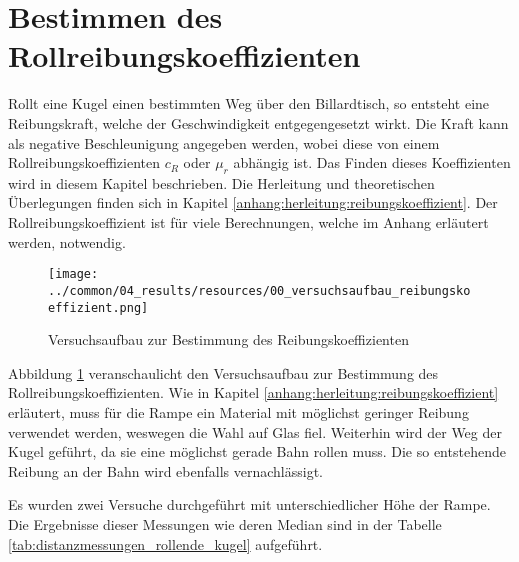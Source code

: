 \section{Bestimmen des Rollreibungskoeffizienten}
Rollt eine Kugel einen bestimmten Weg über den Billardtisch, so entsteht eine Reibungskraft, welche der
Geschwindigkeit entgegengesetzt wirkt. Die Kraft kann als negative Beschleunigung angegeben werden, wobei diese von einem
Rollreibungskoeffizienten $c_R$ oder $\mu_r$ abhängig ist. Das Finden dieses Koeffizienten wird in diesem Kapitel beschrieben.
Die Herleitung und theoretischen Überlegungen finden sich in Kapitel \ref{anhang:herleitung:reibungskoeffizient}.
Der Rollreibungskoeffizient ist für viele Berechnungen, welche im Anhang erläutert werden, notwendig.

\begin{figure}[h!]
    \begin{center}
        \texttt{[image: ../common/04\_results/resources/00\_versuchsaufbau\_reibungskoeffizient.png]}
    \end{center}
    \caption{Versuchsaufbau zur Bestimmung des Reibungskoeffizienten}
    \label{fig:versuchsaufbau_reibungskoeffizient}
\end{figure}

Abbildung \ref{fig:versuchsaufbau_reibungskoeffizient} veranschaulicht den Versuchsaufbau zur Bestimmung des
Rollreibungskoeffizienten. Wie in Kapitel \ref{anhang:herleitung:reibungskoeffizient} erläutert, muss für die
Rampe ein Material mit möglichst geringer Reibung verwendet werden, weswegen die Wahl auf Glas fiel.
Weiterhin wird der Weg der Kugel geführt, da sie eine möglichst gerade Bahn rollen muss. Die so entstehende Reibung
an der Bahn wird ebenfalls vernachlässigt.

Es wurden zwei Versuche durchgeführt mit unterschiedlicher Höhe der Rampe. Die Ergebnisse dieser Messungen wie
deren Median sind in der Tabelle \ref{tab:distanzmessungen_rollende_kugel} aufgeführt.

